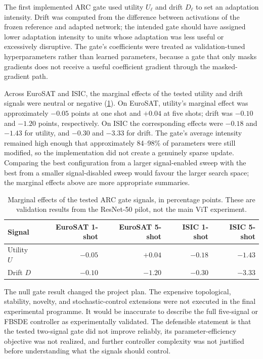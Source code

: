 \documentclass[11pt]{article}
\begin{document}
The first implemented ARC gate used utility $U_\ell$ and drift $D_\ell$ to set an adaptation intensity. Drift was computed from the difference between activations of the frozen reference and adapted network; the intended gate should have assigned lower adaptation intensity to units whose adaptation was less useful or excessively disruptive. The gate's coefficients were treated as validation-tuned hyperparameters rather than learned parameters, because a gate that only masks gradients does not receive a useful coefficient gradient through the masked-gradient path.

Across EuroSAT and ISIC, the marginal effects of the tested utility and drift signals were neutral or negative (\cref{tab:gate}). On EuroSAT, utility's marginal effect was approximately $-0.05$ points at one shot and $+0.04$ at five shots; drift was $-0.10$ and $-1.20$ points, respectively. On ISIC the corresponding effects were $-0.18$ and $-1.43$ for utility, and $-0.30$ and $-3.33$ for drift. The gate's average intensity remained high enough that approximately 84--98\% of parameters were still modified, so the implementation did not create a genuinely sparse update. Comparing the best configuration from a larger signal-enabled sweep with the best from a smaller signal-disabled sweep would favour the larger search space; the marginal effects above are more appropriate summaries.

\begin{table}[t]
\centering
\small
\caption{Marginal effects of the tested ARC gate signals, in percentage points. These are validation results from the ResNet-50 pilot, not the main ViT experiment.}
\label{tab:gate}
\begin{tabular}{lrrrr}
\toprule
Signal & EuroSAT 1-shot & EuroSAT 5-shot & ISIC 1-shot & ISIC 5-shot\\
\midrule
Utility $U$ & $-0.05$ & $+0.04$ & $-0.18$ & $-1.43$\\
Drift $D$ & $-0.10$ & $-1.20$ & $-0.30$ & $-3.33$\\
\bottomrule
\end{tabular}
\end{table}

The null gate result changed the project plan. The expensive topological, stability, novelty, and stochastic-control extensions were not executed in the final experimental programme. It would be inaccurate to describe the full five-signal or FBSDE controller as experimentally validated. The defensible statement is that the tested two-signal gate did not improve reliably, its parameter-efficiency objective was not realized, and further controller complexity was not justified before understanding what the signals should control.
\end{document}

